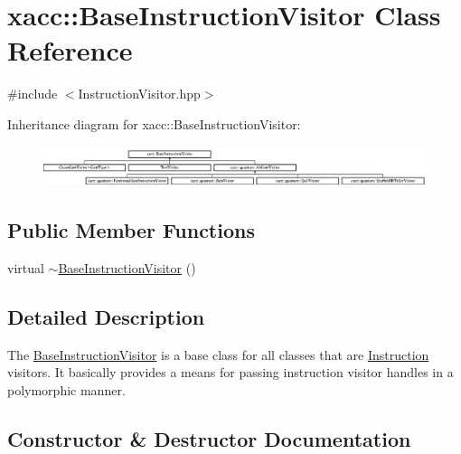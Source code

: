 \hypertarget{a01487}{}\section{xacc\+:\+:Base\+Instruction\+Visitor Class Reference}
\label{a01487}


{\ttfamily \#include $<$Instruction\+Visitor.\+hpp$>$}

Inheritance diagram for xacc\+:\+:Base\+Instruction\+Visitor\+:\begin{figure}[H]
\begin{center}
\leavevmode
\includegraphics[height=1.183099cm]{a01487}
\end{center}
\end{figure}
\subsection*{Public Member Functions}
\begin{DoxyCompactItemize}
\item 
virtual \hyperlink{a01487_aa6f5104f5868fe1eca9be4dc4036eba4}{$\sim$\+Base\+Instruction\+Visitor} ()
\end{DoxyCompactItemize}


\subsection{Detailed Description}
The \hyperlink{a01487}{Base\+Instruction\+Visitor} is a base class for all classes that are \hyperlink{a01479}{Instruction} visitors. It basically provides a means for passing instruction visitor handles in a polymorphic manner. 

\subsection{Constructor \& Destructor Documentation}
\mbox{\label{a01487_aa6f5104f5868fe1eca9be4dc4036eba4}} 

